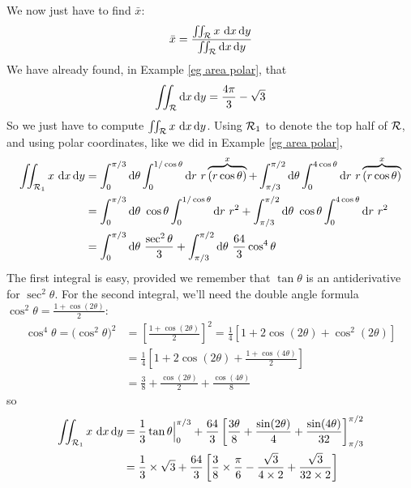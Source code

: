 \begin{eg}
We now just have to find $\bar x$:
\begin{align*}
\bar x =\frac{\iint_{\mathcal{R}} x\  \mathrm{d}x\,\mathrm{d}y}
                      {\iint_{\mathcal{R}} \mathrm{d}x\,\mathrm{d}y}
\end{align*}
We have already found, in Example \ref{eg area polar}, that
\begin{align*}
\iint_{\mathcal{R}} \mathrm{d}x\,\mathrm{d}y = \frac{4\pi}{3}-\sqrt{3}
\end{align*}
So we just have to compute $\iint_{\mathcal{R}} x\ \mathrm{d}x\,\mathrm{d}y$.
Using $\mathcal{R}_1$ to denote the top half of $\mathcal{R}$, and using polar coordinates,
like we did in Example \ref{eg area polar},
\begin{align*}
\dblInt_{\cR_1} x\ \dee{x}\,\dee{y}
&=\int_0^{\pi/3}\dee{\theta}\int_0^{1/\cos\theta}\dee{r}\ r
              \overbrace{(r\cos\theta)}^{x}
     +\int_{\pi/3}^{\pi/2}\dee{\theta}\int_0^{4\cos\theta}\dee{r}\ r
             \overbrace{(r\cos\theta)}^{x} \\
&=\int_0^{\pi/3}\dee{\theta}\ \cos\theta\int_0^{1/\cos\theta}\dee{r}\ r^2
  +\int_{\pi/3}^{\pi/2}\dee{\theta}\ \cos\theta
                         \int_0^{4\cos\theta}\dee{r}\ r^2 \\
&=\int_0^{\pi/3}\dee{\theta}\ \frac{\sec^2\theta}{3}
   +\int_{\pi/3}^{\pi/2}\dee{\theta}\ \frac{64}{3}\cos^4\theta 
\end{align*}
The first integral is easy, provided we remember that $\tan\theta$
is an antiderivative for $\sec^2\theta$. For the second integral,
we'll need the double angle formula $\cos^2\theta=\frac{1+\cos(2\theta)}{2}$:
\begin{align*}
\cos^4\theta =\big(\cos^2\theta\big)^2
  &=\left[\frac{1+\cos(2\theta)}{2}\right]^2
   =\frac{1}{4}\left[1+2\cos(2\theta)+\cos^2(2\theta)\right] \\
   &=\frac{1}{4}\left[1+2\cos(2\theta)+\frac{1+\cos(4\theta)}{2}\right] \\
   &=\frac{3}{8} +\frac{\cos(2\theta)}{2} + \frac{\cos(4\theta)}{8}
\end{align*}
so
\begin{align*}
\dblInt_{\cR_1} x\ \dee{x}\,\dee{y}
&=\frac{1}{3}\tan\theta\Big|_0^{\pi/3}
    +\frac{64}{3}\left[\frac{3\theta}{8}
    +\frac{\sin(2\theta)}{4}+\frac{\sin(4\theta)}{32}\right]_{\pi/3}^{\pi/2} \\
&=\frac{1}{3}\times\sqrt{3} 
   +\frac{64}{3}\left[\frac{3}{8}\times\frac{\pi}{6}
                      -\frac{\sqrt{3}}{4\times 2}
                      +\frac{\sqrt{3}}{32\times 2}\right] \\

\end{align*}
\end{eg}

